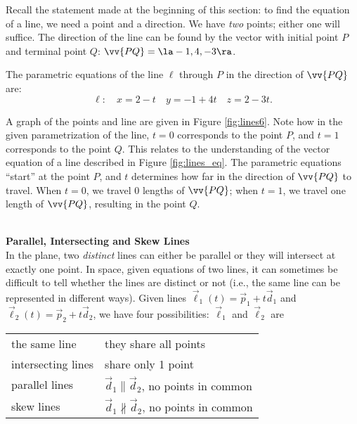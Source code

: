 {Recall the statement made at the beginning of this section: to find the equation of a line, we need a point and a direction. We have \emph{two} points; either one will suffice. The direction of the line can be found by the vector with initial point $P$ and terminal point $Q$: $\vv{PQ} = \la -1,4,-3\ra$.

The parametric equations of the line $\ell$ through $P$ in the direction of $\vv{PQ}$ are:
$$\ell: \quad x= 2-t\quad y=-1+4t \quad z=2-3t.$$

A graph of the points and line are given in Figure \ref{fig:lines6}. Note how in the given parametrization of the line, $t=0$ corresponds to the point $P$, and $t=1$ corresponds to the point $Q$. This relates to the understanding of the vector equation of a line described in Figure \ref{fig:lines_eq}. The parametric equations ``start'' at the point $P$, and $t$ determines how far in the direction of $\vv{PQ}$ to travel. When $t=0$, we travel 0 lengths of $\vv{PQ}$; when $t=1$, we travel one length of $\vv{PQ}$, resulting in the point $Q$.
}\\

\noindent \textbf{\large Parallel, Intersecting and Skew Lines}\\

In the plane, two \emph{distinct} lines can either be parallel or they will intersect at exactly one point. In space, given equations of two lines, it can sometimes be difficult to tell whether the lines are distinct or not (i.e., the same line can be represented in different ways). Given lines $\vec\ell_1(t) = \vec p_1 + t\vec d_1$ and $\vec \ell_2(t) = \vec p_2+t\vec d_2$, we have four possibilities: $\vec \ell_1$ and $\vec \ell_2$ are

\begin{center}
\begin{tabular}{p{100pt}p{150pt}}
the same line & they share all points \\
intersecting lines & share only 1 point\\
parallel lines & $\vec d_1\parallel \vec d_2$, no points in common \\
skew lines & $\vec d_1\nparallel \vec d_2$, no points in common 
\end{tabular}
\end{center}

